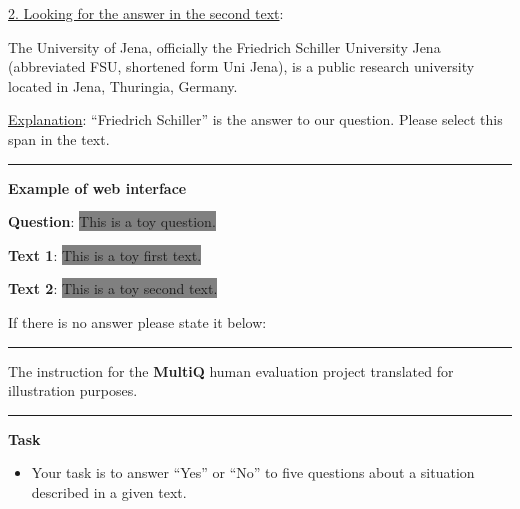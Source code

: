 \documentclass[11pt]{article}
\begin{document}
\begin{table*}[pht!]
\begin{minipage}[t]{.43\linewidth}
\vspace{0.05cm} 
\noindent \underline{2. Looking for the answer in the second text}:
    
The University of Jena, officially the \colorbox{cb-salmon-pink}{Friedrich Schiller} University Jena (abbreviated FSU, shortened form Uni Jena), is a public research university located in Jena, Thuringia, Germany.

\vspace{0.05cm} 
\noindent \underline{Explanation}: ``Friedrich Schiller'' is the answer to our question. Please select this span in the text.



\par\noindent\rule{\textwidth}{0.8pt}

\vspace{0.05cm}
\textbf{Example of web interface}
\vspace{0.1cm}



\textbf{Question}: \colorbox{Gray}{This is a toy question.}

\textbf{Text 1}: \colorbox{Gray}{This is a toy first text.}

\textbf{Text 2}: \colorbox{Gray}{This is a toy second text.}


\vspace{0.1cm}
If there is no answer please state it below:


\par\noindent\rule{\textwidth}{1pt}

\caption{The instruction for the \textbf{MultiQ} human evaluation project translated for illustration purposes.}
\label{tab:multiq}

\end{minipage}

\end{table*} \begin{table*}[t!]
\scriptsize

\begin{minipage}[t]{.43\linewidth}
\par\noindent\rule{\textwidth}{1pt}

\vspace{.5cm}

\textbf{Task}
\vspace{0.05cm}
\begin{itemize}[noitemsep,topsep=0.1pt]
    \item Your task is to answer ``Yes'' or ``No'' to five questions about a situation described in a given text.
    

\end{itemize}
\end{minipage}
\end{table*}
\end{document}
